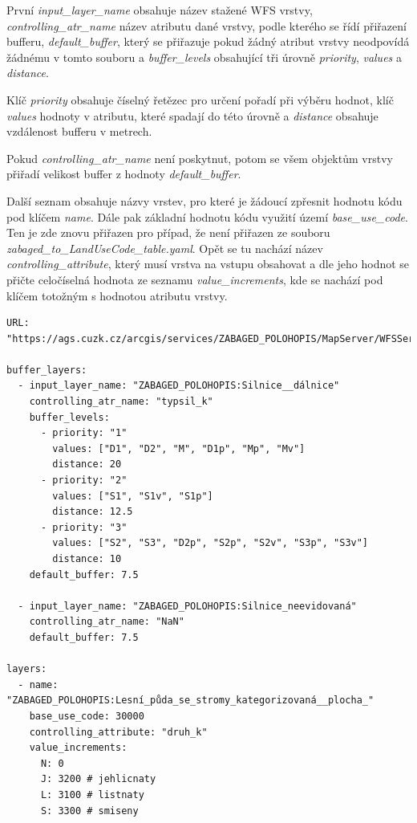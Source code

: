 \documentclass[a4paper,oneside,12pt]{book}
\begin{document}
\hspace{10mm}První \textit{input\_layer\_name} obsahuje název stažené WFS vrstvy, \newline \textit{controlling\_atr\_name} název atributu dané vrstvy, podle kterého se řídí přiřazení bufferu, \textit{default\_buffer}, který se přiřazuje pokud žádný atribut vrstvy neodpovídá žádnému v tomto souboru a \textit{buffer\_levels} obsahující tři úrovně \textit{priority}, \textit{values} a \textit{distance}.

\hspace{10mm}Klíč \textit{priority} obsahuje číselný řetězec pro určení pořadí při výběru hodnot, klíč \textit{values} hodnoty v atributu, které spadají do této úrovně a \textit{distance} obsahuje vzdálenost bufferu v metrech.

\hspace{10mm}Pokud \textit{controlling\_atr\_name} není poskytnut, potom se všem objektům vrstvy přiřadí velikost buffer z hodnoty \textit{default\_buffer}.

\hspace{10mm}Další seznam obsahuje názvy vrstev, pro které je žádoucí zpřesnit hodnotu kódu pod klíčem \textit{name}. Dále pak základní hodnotu kódu využití území \textit{base\_use\_code}. Ten je zde znovu přiřazen pro případ, že není přiřazen ze souboru  \newline \textit{zabaged\_to\_LandUseCode\_table.yaml}. Opět se tu nachází název \textit{controlling\_attribute}, který musí vrstva na vstupu obsahovat a dle jeho hodnot se přičte celočíselná hodnota ze seznamu \textit{value\_increments}, kde se nachází pod klíčem totožným s hodnotou atributu vrstvy. 

\begin{lstlisting}[style=myyaml, caption={Ukázka ZABAGED.yaml},label={kod:ZABAGED.yaml}]
URL: "https://ags.cuzk.cz/arcgis/services/ZABAGED_POLOHOPIS/MapServer/WFSServer"

buffer_layers:
  - input_layer_name: "ZABAGED_POLOHOPIS:Silnice__dálnice"
    controlling_atr_name: "typsil_k"
    buffer_levels:
      - priority: "1"
        values: ["D1", "D2", "M", "D1p", "Mp", "Mv"]
        distance: 20
      - priority: "2"
        values: ["S1", "S1v", "S1p"]
        distance: 12.5
      - priority: "3"
        values: ["S2", "S3", "D2p", "S2p", "S2v", "S3p", "S3v"]
        distance: 10
    default_buffer: 7.5

  - input_layer_name: "ZABAGED_POLOHOPIS:Silnice_neevidovaná"
    controlling_atr_name: "NaN"
    default_buffer: 7.5

layers:
  - name: "ZABAGED_POLOHOPIS:Lesní_půda_se_stromy_kategorizovaná__plocha_"
    base_use_code: 30000
    controlling_attribute: "druh_k"
    value_increments:
      N: 0
      J: 3200 # jehlicnaty
      L: 3100 # listnaty
      S: 3300 # smiseny
\end{lstlisting}
\end{document}
